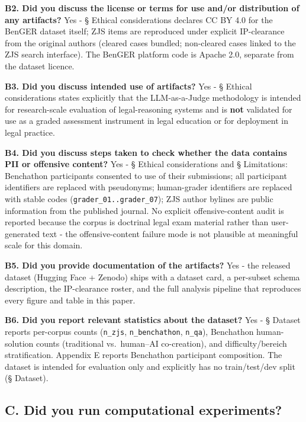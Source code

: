 \documentclass[11pt]{article}
\begin{document}
\textbf{B2. Did you discuss the license or terms for use and/or
distribution of any artifacts?} Yes - § Ethical considerations declares
CC BY 4.0 for the BenGER dataset itself; ZJS items are reproduced under
explicit IP-clearance from the original authors (cleared cases bundled;
non-cleared cases linked to the ZJS search interface). The BenGER
platform code is Apache 2.0, separate from the dataset licence.

\textbf{B3. Did you discuss intended use of artifacts?} Yes - § Ethical
considerations states explicitly that the LLM-as-a-Judge methodology is
intended for research-scale evaluation of legal-reasoning systems and is
\textbf{not} validated for use as a graded assessment instrument in
legal education or for deployment in legal practice.

\textbf{B4. Did you discuss steps taken to check whether the data
contains PII or offensive content?} Yes - § Ethical considerations and §
Limitations: Benchathon participants consented to use of their
submissions; all participant identifiers are replaced with pseudonyms;
human-grader identifiers are replaced with stable codes
(\texttt{grader\_01..grader\_07}); ZJS author bylines are public
information from the published journal. No explicit offensive-content
audit is reported because the corpus is doctrinal legal exam material
rather than user-generated text - the offensive-content failure mode is
not plausible at meaningful scale for this domain.

\textbf{B5. Did you provide documentation of the artifacts?} Yes - the
released dataset (Hugging Face + Zenodo) ships with a dataset card, a
per-subset schema description, the IP-clearance roster, and the full
analysis pipeline that reproduces every figure and table in this paper.

\textbf{B6. Did you report relevant statistics about the dataset?} Yes -
§ Dataset reports per-corpus counts (\texttt{n\_zjs},
\texttt{n\_benchathon}, \texttt{n\_qa}), Benchathon human-solution
counts (traditional vs.~human--AI co-creation), and difficulty/bereich
stratification. Appendix E reports Benchathon participant composition.
The dataset is intended for evaluation only and explicitly has no
train/test/dev split (§ Dataset).

\subsection{C. Did you run computational
experiments?}\label{c.-did-you-run-computational-experiments}
\end{document}

